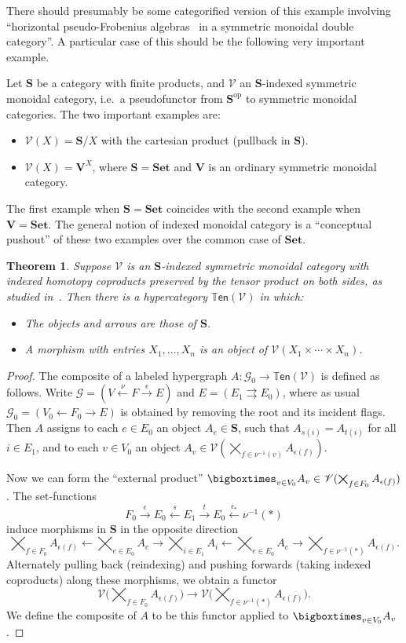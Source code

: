\documentclass{article}
\newtheorem{thm}{Theorem}[section]
\theoremstyle{definition}
\theoremstyle{remark}
\def\G{\mathcal{G}}
\def\V{\mathscr{V}}
\def\ten{\mathbb{T}\mathsf{en}}
\def\Set{\mathbf{Set}}
\def\op{^{\mathrm{op}}}
\let\ot\leftarrow
\let\xto\xrightarrow
\let\xot\xleftarrow
\def\bS{\ensuremath{\mathbf{S}}\xspace}
\begin{document}
There should presumably be some categorified version of this example involving ``horizontal pseudo-Frobenius algebras~\cite{lauda:psfrob} in a symmetric monoidal double category''.
A particular case of this should be the following very important example.

Let \bS be a category with finite products, and $\V$ an \bS-indexed symmetric monoidal category, i.e.\ a pseudofunctor from $\bS\op$ to symmetric monoidal categories.
The two important examples are:
\begin{itemize}
\item $\V(X) = \bS/X$ with the cartesian product (pullback in \bS).
\item $\V(X) = \mathbf{V}^X$, where $\bS=\Set$ and $\mathbf{V}$ is an ordinary symmetric monoidal category.
\end{itemize}
The first example when $\bS=\Set$ coincides with the second example when $\mathbf{V}=\Set$.
The general notion of indexed monoidal category is a ``conceptual pushout'' of these two examples over the common case of $\Set$.

\begin{thm}
  Suppose $\V$ is an \bS-indexed symmetric monoidal category with indexed homotopy coproducts preserved by the tensor product on both sides, as studied in~\cite{shulman:frbi,ps:indexed}.
  Then there is a hypercategory $\ten(\V)$ in which:
  \begin{itemize}
  \item The objects and arrows are those of \bS.
  \item A morphism with entries $X_1,\dots,X_n$ is an object of $\V(X_1\times\cdots\times X_n)$.
  \end{itemize}
\end{thm}
\begin{proof}
  The composite of a labeled hypergraph $A:\G_0\to\ten(\V)$ is defined as follows.
  Write $\G= (V\xot{\nu} F\xto{\epsilon} E)$ and $E = (E_1 \rightrightarrows E_0)$, where as usual $\G_0 = (V_0 \ot F_0 \to E)$ is obtained by removing the root and its incident flags.
  Then $A$ assigns to each $e\in E_0$ an object $A_e\in \bS$, such that $A_{s(i)}=A_{t(i)}$ for all $i\in E_1$, and to each $v\in V_0$ an object $A_v \in \V(\bigtimes_{f\in \nu^{-1}(v)} A_{\epsilon(f)})$.

  Now we can form the ``external product'' $\bigboxtimes_{v\in V_0} A_v \in \V(\bigtimes_{f\in F_0} A_{\epsilon(f)})$.
  The set-functions
  \[ F_0 \xto{\epsilon} E_0 \xot{s} E_1 \xto{t} E_0 \xot{\epsilon_\ast} \nu^{-1}(\ast) \]
  induce morphisms in \bS in the opposite direction
  \[ \bigtimes_{f\in F_0} A_{\epsilon(f)} \ot \bigtimes_{e\in E_0} A_e \to \bigtimes_{i\in E_1} A_{i} \ot \bigtimes_{e\in E_0} A_e \to \bigtimes_{f\in \nu^{-1}(\ast)} A_{\epsilon(f)}. \]
  Alternately pulling back (reindexing) and pushing forwards (taking indexed coproducts) along these morphisms, we obtain a functor
  \[ \V\Big(\bigtimes_{f\in F_0} A_{\epsilon(f)}\Big) \to \V\Big(\bigtimes_{f\in \nu^{-1}(\ast)} A_{\epsilon(f)}\Big). \]
  We define the composite of $A$ to be this functor applied to $\bigboxtimes_{v\in V_0} A_v$.
\end{proof}
\end{document}

